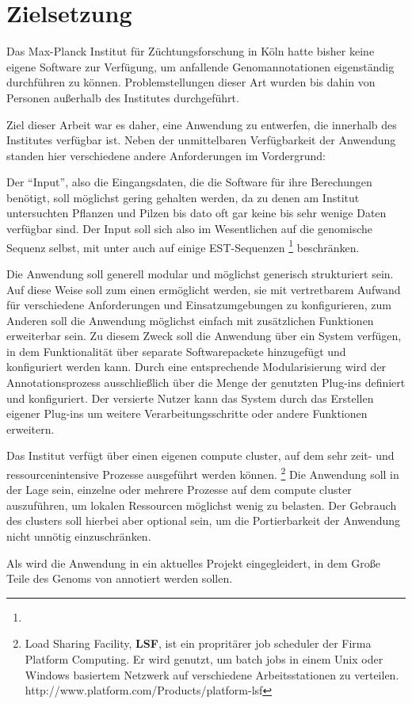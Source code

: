 
\chapter{Zielsetzung}\label{chp:zielsetzung}
Das Max-Planck Institut für Züchtungsforschung in Köln hatte bisher keine
eigene Software zur Verfügung, um anfallende Genomannotationen eigenständig
durchführen zu können. Problemstellungen dieser Art wurden bis dahin von
Personen außerhalb des Institutes durchgeführt.

Ziel dieser Arbeit war es daher, eine Anwendung zu entwerfen, die
innerhalb des Institutes verfügbar ist. Neben der unmittelbaren Verfügbarkeit
der Anwendung standen hier verschiedene andere Anforderungen im Vordergrund:

Der \enquote{Input}, also die Eingangsdaten, die die Software für ihre
Berechungen benötigt, soll möglichst gering gehalten werden, da zu denen am
Institut untersuchten Pflanzen und Pilzen bis dato oft gar keine bis sehr wenige
Daten verfügbar sind.
Der Input soll sich also im Wesentlichen auf die genomische Sequenz selbst, mit
unter auch auf einige EST-Sequenzen
\footnote{}
beschränken.

Die Anwendung soll generell modular und möglichst generisch strukturiert sein.
Auf diese Weise soll zum einen ermöglicht werden, sie mit vertretbarem
Aufwand für verschiedene Anforderungen und Einsatzumgebungen zu konfigurieren,
zum Anderen soll die Anwendung möglichst einfach mit zusätzlichen Funktionen
erweiterbar sein.
Zu diesem Zweck soll die Anwendung über ein  System verfügen, in
dem Funktionalität über separate Softwarepackete hinzugefügt und konfiguriert
werden kann.
Durch eine entsprechende  Modularisierung wird der Annotationsprozess
ausschließlich über die Menge der genutzten Plug-ins definiert und
konfiguriert.
Der versierte Nutzer kann das System durch das Erstellen eigener Plug-ins um
weitere Verarbeitungsschritte oder andere Funktionen erweitern.

Das Institut verfügt über einen eigenen compute cluster, auf dem sehr zeit- und
ressourcenintensive Prozesse ausgeführt werden können.
\footnote{Load Sharing Facility, \textbf{LSF}, ist ein propritärer job scheduler
der Firma Platform Computing.
Er wird genutzt, um batch jobs in einem Unix oder
Windows basiertem Netzwerk auf verschiedene Arbeitsstationen zu
verteilen.
\citep{ault_oracle_2004} {http://www.platform.com/Products/platform-lsf}}
Die Anwendung soll in der Lage sein, einzelne oder mehrere Prozesse auf dem
compute cluster auszuführen, um lokalen Ressourcen möglichst wenig zu
belasten. Der Gebrauch des clusters soll hierbei aber optional sein, um die
Portierbarkeit der Anwendung nicht unnötig einzuschränken. 

Als  wird die Anwendung in ein aktuelles Projekt
eingegleidert, in dem Große Teile des Genoms von  annotiert werden sollen. 

